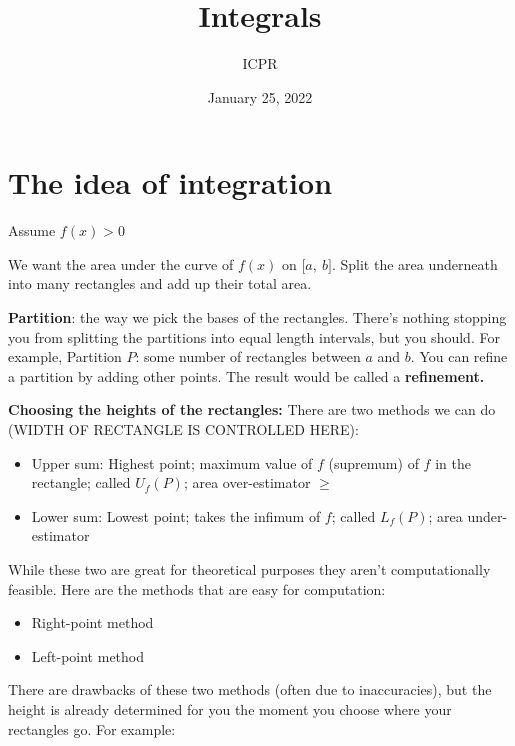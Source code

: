 \documentclass[12pt]{article}
\title{Integrals}
\author{ICPR}
\date{January 25, 2022}
\theoremstyle{plain}
\theoremstyle{remark}
\theoremstyle{definition}
\begin{document}
\maketitle

{
\setcounter{tocdepth}{3}
\tableofcontents
}

\section{The idea of integration}

Assume \(f(x) > 0\)

We want the area under the curve of \(f(x)\) on
\(\lbrack a,\ b\rbrack\). Split the area underneath into many rectangles
and add up their total area.


\textbf{Partition}: the way we pick the bases of the rectangles. There's
nothing stopping you from splitting the partitions into equal length
intervals, but you should. For example, Partition \(P\): some number of
rectangles between \(a\) and \(b\). You can refine a partition by adding
other points. The result would be called a \textbf{refinement.}

\textbf{Choosing the heights of the rectangles:} There are two methods
we can do (WIDTH OF RECTANGLE IS CONTROLLED HERE):

\begin{itemize}
\item
  Upper sum: Highest point; maximum value of \(f\) (supremum) of \(f\)
  in the rectangle; called \(U_{f}(P)\); area over-estimator \(\geq\)
\end{itemize}


\begin{itemize}
\item
  Lower sum: Lowest point; takes the infimum of \(f\); called
  \(L_{f}(P)\); area under-estimator
\end{itemize}


While these two are great for theoretical purposes they aren't
computationally feasible. Here are the methods that are easy for
computation:

\begin{itemize}
\item
  Right-point method
\end{itemize}


\begin{itemize}
\item
  Left-point method
\end{itemize}


There are drawbacks of these two methods (often due to inaccuracies),
but the height is already determined for you the moment you choose where
your rectangles go. For example:
\end{document}
